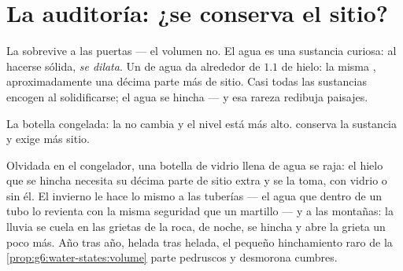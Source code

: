 \section{La auditoría: ¿se conserva el sitio?}

\begin{proposition}\label{prop:g6:water-states:volume}
La  sobrevive a las puertas --- el volumen no. El agua es una
sustancia curiosa: al hacerse sólida, \emph{se dilata}. Un 
de agua da alrededor de $1.1$  de hielo: la misma ,
aproximadamente una décima parte más de sitio. Casi todas las
sustancias encogen al solidificarse; el agua se hincha --- y esa
rareza redibuja paisajes.
\end{proposition}

\begin{omfigure}

{\small La botella congelada: la  no cambia y el nivel está más
alto.  conserva la sustancia y exige más sitio.}
\end{omfigure}

\begin{example}\label{ex:g6:water-states:burst}
Olvidada en el congelador, una botella de vidrio llena de agua se
raja: el hielo que se hincha necesita su décima parte de sitio extra y
se la toma, con vidrio o sin él. El invierno le hace lo mismo a las
tuberías --- el agua que  dentro de un tubo lo revienta con
la misma seguridad que un martillo --- y a las montañas: la lluvia se
cuela en las grietas de la roca,  de noche, se hincha y
abre la grieta un poco más. Año tras año, helada tras
helada, el pequeño hinchamiento raro de la
\cref{prop:g6:water-states:volume} parte pedruscos y desmorona
cumbres.
\end{example}

